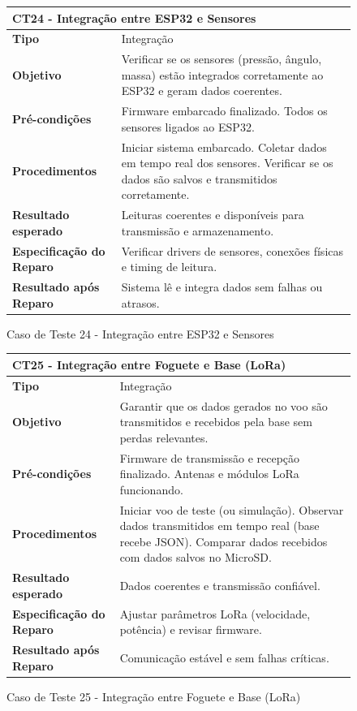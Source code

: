 \begin{figure}[H]
    \centering
\begin{longtable}{|p{}|p{}|}
\hline
\multicolumn{2}{|l|}{\textbf{CT24 - Integração entre ESP32 e Sensores}} \\
\hline
\textbf{Tipo} & Integração \\
\hline
\textbf{Objetivo} & Verificar se os sensores (pressão, ângulo, massa) estão integrados corretamente ao ESP32 e geram dados coerentes. \\
\hline
\textbf{Pré-condições} & Firmware embarcado finalizado.  Todos os sensores ligados ao ESP32. \\
\hline
\textbf{Procedimentos} & Iniciar sistema embarcado.  Coletar dados em tempo real dos sensores.  Verificar se os dados são salvos e transmitidos corretamente. \\
\hline
\textbf{Resultado esperado} & Leituras coerentes e disponíveis para transmissão e armazenamento. \\
\hline
\textbf{Especificação do Reparo} & Verificar drivers de sensores, conexões físicas e timing de leitura. \\
\hline
\textbf{Resultado após Reparo} & Sistema lê e integra dados sem falhas ou atrasos. \\
\hline
\end{longtable}
\caption{Caso de Teste 24 - Integração entre ESP32 e Sensores}
\label{fig_ct24_integracao_esp32_sensores}
\end{figure}

\begin{figure}[H]
    \centering
\begin{longtable}{|p{}|p{}|}
\hline
\multicolumn{2}{|l|}{\textbf{CT25 - Integração entre Foguete e Base (LoRa)}} \\
\hline
\textbf{Tipo} & Integração \\
\hline
\textbf{Objetivo} & Garantir que os dados gerados no voo são transmitidos e recebidos pela base sem perdas relevantes. \\
\hline
\textbf{Pré-condições} & Firmware de transmissão e recepção finalizado.  Antenas e módulos LoRa funcionando. \\
\hline
\textbf{Procedimentos} & Iniciar voo de teste (ou simulação).  Observar dados transmitidos em tempo real (base recebe JSON).  Comparar dados recebidos com dados salvos no MicroSD. \\
\hline
\textbf{Resultado esperado} & Dados coerentes e transmissão confiável. \\
\hline
\textbf{Especificação do Reparo} & Ajustar parâmetros LoRa (velocidade, potência) e revisar firmware. \\
\hline
\textbf{Resultado após Reparo} & Comunicação estável e sem falhas críticas. \\
\hline
\end{longtable}
\caption{Caso de Teste 25 - Integração entre Foguete e Base (LoRa)}
\label{fig_ct25_integracao_foguete_base_lora}
\end{figure}

